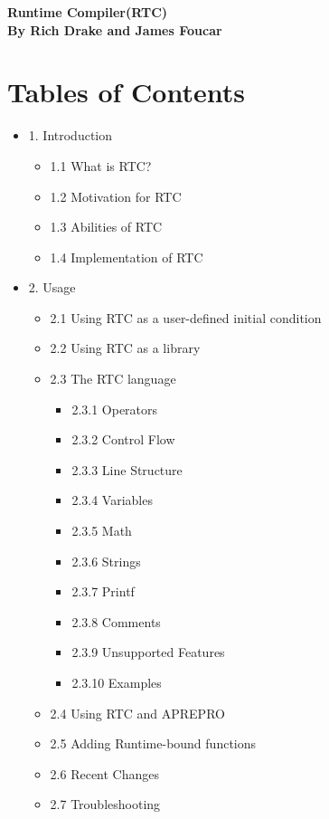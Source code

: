 \documentclass{article}
\begin{document}
\thispagestyle{empty}
\begin{center}
  \large\bf Runtime Compiler(RTC) \\
  \large\bf By Rich Drake and James Foucar \\
  \bigskip
\end{center}


\section*{Tables of Contents}
\begin{itemize}
  \item 1. Introduction
    \begin{itemize}
      \item 1.1 What is RTC?
      \item 1.2 Motivation for RTC
      \item 1.3 Abilities of RTC
      \item 1.4 Implementation of RTC
    \end{itemize}
  \item 2. Usage
    \begin{itemize}
      \item 2.1 Using RTC as a user-defined initial condition
      \item 2.2 Using RTC as a library
      \item 2.3 The RTC language
        \begin{itemize}
          \item 2.3.1 Operators
          \item 2.3.2 Control Flow
          \item 2.3.3 Line Structure
          \item 2.3.4 Variables
          \item 2.3.5 Math
          \item 2.3.6 Strings
          \item 2.3.7 Printf
          \item 2.3.8 Comments
          \item 2.3.9 Unsupported Features
          \item 2.3.10 Examples
        \end{itemize}
      \item 2.4 Using RTC and APREPRO
      \item 2.5 Adding Runtime-bound functions
      \item 2.6 Recent Changes
      \item 2.7 Troubleshooting
    \end{itemize}
\end{itemize}
\end{document}
